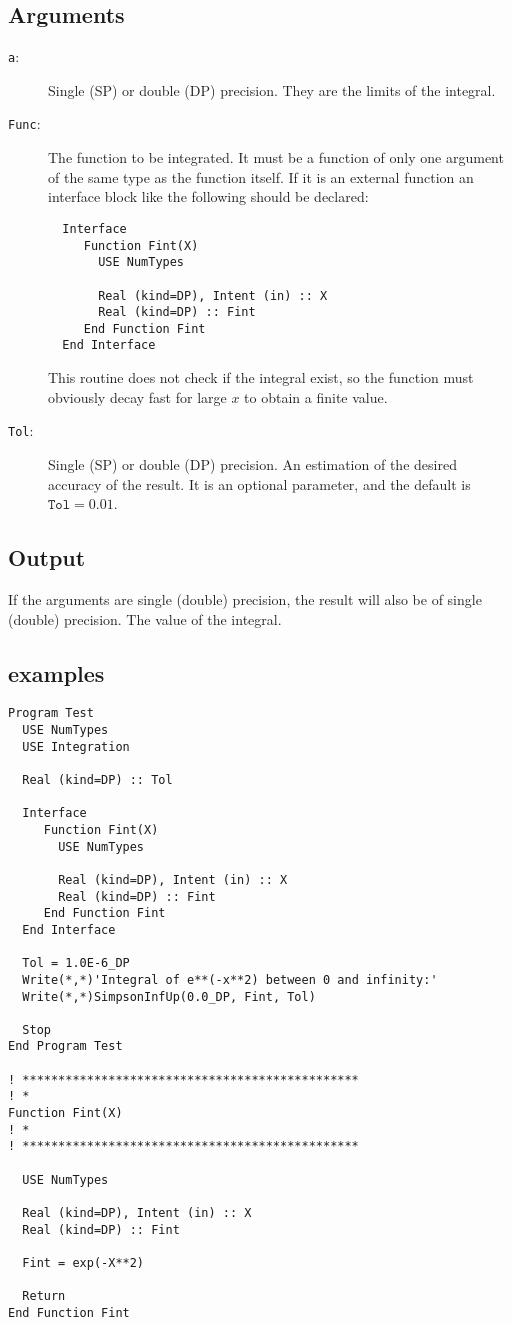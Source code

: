\subsection{Arguments}

\begin{description}
\item[\texttt{a}:] Single (SP) or double (DP) precision. They are
  the limits of the integral.
\item[\texttt{Func}:] The function to be integrated. It must be a
  function of only one argument of the same type as the function
  itself. If it is an
  external function an interface block like the following should be
  declared: 
\begin{verbatim}
  Interface 
     Function Fint(X)
       USE NumTypes

       Real (kind=DP), Intent (in) :: X
       Real (kind=DP) :: Fint
     End Function Fint
  End Interface
\end{verbatim}
  This routine does not check if the integral exist, so the function
  must obviously decay fast for large $x$ to obtain a finite value.
\item[\texttt{Tol}:] Single (SP) or double (DP) precision. An
  estimation of the desired accuracy of the result. It is an optional
  parameter, and the default is $\mathtt{Tol} = 0.01$. 
\end{description}


\subsection{Output}

If the arguments are single (double) precision, the result will also be of
single (double) precision. The value of the integral.


\subsection{examples}

\begin{verbatim}
Program Test
  USE NumTypes
  USE Integration

  Real (kind=DP) :: Tol

  Interface 
     Function Fint(X)
       USE NumTypes

       Real (kind=DP), Intent (in) :: X
       Real (kind=DP) :: Fint
     End Function Fint
  End Interface

  Tol = 1.0E-6_DP
  Write(*,*)'Integral of e**(-x**2) between 0 and infinity:'
  Write(*,*)SimpsonInfUp(0.0_DP, Fint, Tol)

  Stop
End Program Test

! ***********************************************
! *
Function Fint(X)
! *  
! ***********************************************

  USE NumTypes

  Real (kind=DP), Intent (in) :: X
  Real (kind=DP) :: Fint

  Fint = exp(-X**2)

  Return
End Function Fint
\end{verbatim}


